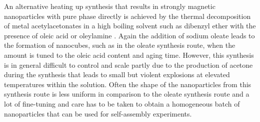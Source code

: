 \documentclass[\main/dresen_thesis.tex]{subfiles}
\begin{document}
  An alternative heating up synthesis that results in strongly magnetic nanoparticles with pure phase directly is achieved by the thermal decomposition of metal acetylacetonates in a high boiling solvent such as dibenzyl ether with the presence of oleic acid or oleylamine \cite{Sun_2002_SizeC, Wu_2014_Monol}.
  Again the addition of sodium oleate leads to the formation of nanocubes, such as in the oleate synthesis route, when the amount is tuned to the oleic acid content and aging time.
  However, this synthesis is in general difficult to control and scale partly due to the production of acetone during the synthesis that leads to small but violent explosions at elevated temperatures within the solution.
  Often the shape of the nanoparticles from this synthesis route is less uniform in comparison to the oleate synthesis route and a lot of fine-tuning and care has to be taken to obtain a homogeneous batch of nanoparticles that can be used for self-assembly experiments.
  
\end{document}
